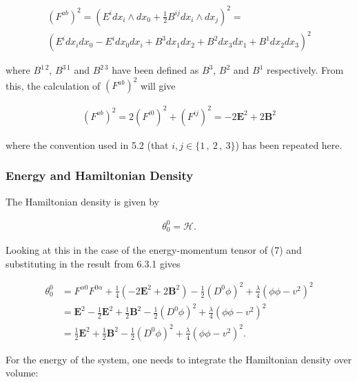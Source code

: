 \documentclass[fleqn, twocolumn, 10pt]{article}
\begin{document}
\begin{ceqn} 
\begin{align*}
\left(F^{ab}\right)^2 = \left(E^idx_i\land dx_0+ \frac{1}{2}B^{ij}dx_i \land dx_j\right)^2 =\;\;\;\;\;\;\;\;\;\;\;\;\\ 
\left(E^idx_idx_0 \!- \!E^idx_0dx_i \!+ \!B^3dx_1dx_2 \!+ \!B^2dx_3dx_1 \!+ \!B^1dx_2dx_3\right)^2
\end{align*}
\end{ceqn}
where $B^{1\,2}$, $B^{3\,1}$ and $B^{2\,3}$ have been defined as $B^3$, $B^2$ and $B^1$ respectively. From this, the calculation of $(F^{ab})^2$ will give

\begin{ceqn} 
\begin{align*}
(F^{ab})^2 = 2(F^{i0})^2 + (F^{ij})^2 = -2\bm{E}^2 + 2\bm{B}^2
\end{align*}
\end{ceqn}
where the convention used in 5.2 (that $i, j \in \{ 1\,,\: 2\,,\: 3\}$) has been repeated here. 


\subsubsection{Energy and Hamiltonian Density}

The Hamiltonian density is given by

\begin{ceqn} 
\begin{align*}
\theta^0_0 = \mathbf{\mathcal{H}}. 
\end{align*}
\end{ceqn}
Looking at this in the case of the energy-momentum tensor of (7) and substituting in the result from 6.3.1 gives

\begin{ceqn} 
\begin{align*}
\theta^0_0 &= F^{\alpha 0}F^{0\alpha} + \frac{1}{4}(-2\bm{E}^2 + 2\bm{B}^2) - \frac{1}{2} (D^0 \phi)^2 + \frac{\lambda}{4}(\phi \phi - v^2)^2\\
&= \bm{E}^2 - \frac{1}{2}\bm{E}^2 + \frac{1}{2}\bm{B}^2 - \frac{1}{2} (D^0 \phi)^2 + \frac{\lambda}{4}(\phi \phi - v^2)^2\\
&= \frac{1}{2}\bm{E}^2 + \frac{1}{2}\bm{B}^2 - \frac{1}{2} (D^0 \phi)^2 + \frac{\lambda}{4}(\phi \phi - v^2)^2.
\end{align*}
\end{ceqn}
For the energy of the system, one needs to integrate the Hamiltonian density over volume:
\end{document}
